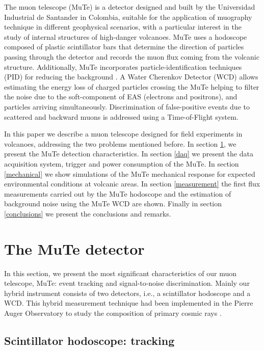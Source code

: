 \documentclass[letterpaper,11pt]{article}
\begin{document}
The muon telescope (MuTe) \cite{AsoreyEtal2017B, SierraPortaEtal2018} is a detector designed and built by the Universidad Industrial de Santander in Colombia, suitable for the application of muography technique in different geophysical scenarios, with a particular interest in the study of internal structures of high-danger volcanoes. MuTe uses a hodoscope composed of plastic scintillator bars that determine the direction of particles passing through the detector and records the muon flux coming from the volcanic structure. Additionally, MuTe incorporates particle-identification techniques (PID) for reducing the background \cite{Bonechi2019, pena2019calibration}. A Water Cherenkov Detector (WCD) allows estimating the energy loss of charged particles crossing the MuTe helping to filter the noise due to the soft-component of EAS (electrons and positrons), and particles arriving simultaneously. Discrimination of false-positive events due to scattered and backward muons is addressed using a Time-of-Flight system.

In this paper we describe a muon telescope designed for field experiments in volcanoes, addressing the two problems mentioned before. In section \ref{detector}, we present the MuTe detection characteristics. In section \ref{daq} we present the data acquisition system, trigger and power consumption of the MuTe. In section \ref{mechanical} we show simulations of the MuTe mechanical response for expected environmental conditions at volcanic areas. In section \ref{measurement} the first flux measurements carried out by the MuTe hodoscope and the estimation of background noise using the MuTe WCD are shown. Finally in section \ref{conclusions} we present the conclusions and remarks.

\section{The MuTe detector}
\label{detector}
In this section, we present the most significant characteristics of our muon telescope, MuTe: event tracking and signal-to-noise discrimination. Mainly our hybrid instrument consists of two detectors, i.e., a scintillator hodoscope and a WCD. This hybrid measurement technique had been implemented in the Pierre Auger Observatory to study the composition of primary cosmic rays \cite{martello2017pierre, aab2017muon, aab2016prototype}. 

\subsection{Scintillator hodoscope: tracking}
\end{document}
